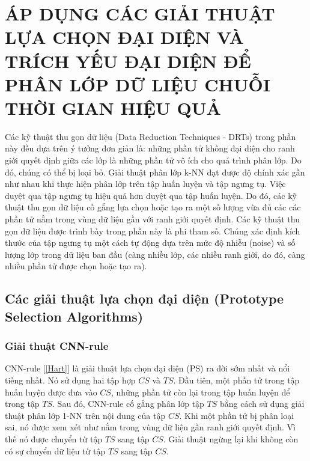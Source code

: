 \documentclass[13pt,oneside]{scrbook}
\begin{document}
\section{ÁP DỤNG CÁC GIẢI THUẬT LỰA CHỌN ĐẠI DIỆN VÀ TRÍCH YẾU ĐẠI DIỆN ĐỂ PHÂN LỚP DỮ LIỆU CHUỖI THỜI GIAN HIỆU QUẢ}
Các kỹ thuật thu gọn dữ liệu (Data Reduction Techniques - DRTs) trong phần này đều dựa trên ý tưởng đơn giản là: những phần tử không đại diện cho ranh giới quyết định giữa các lớp là những phần tử vô ích cho quá trình phân lớp. Do đó, chúng có thể bị loại bỏ. Giải thuật phân lớp k-NN đạt được độ chính xác gần như nhau khi thực hiện phân lớp trên tập huấn luyện và tập ngưng tụ. Việc duyệt qua tập ngưng tụ hiệu quả hơn duyệt qua tập huấn luyện. Do đó, các kỹ thuật thu gọn dữ liệu cố gắng lựa chọn hoặc tạo ra một số lượng vừa đủ các các phần tử nằm trong vùng dữ liệu gần với ranh giới quyết định. Các kỹ thuật thu gọn dữ liệu được trình bày trong phần này là phi tham số. Chúng xác định kích thước của tập ngưng tụ một cách tự động dựa trên mức độ nhiễu (noise) và số lượng lớp trong dữ liệu ban đầu (càng nhiều lớp, các nhiều ranh giới, do đó, càng nhiều phần tử được chọn hoặc tạo ra).
\subsection{Các giải thuật lựa chọn đại diện (Prototype Selection Algorithms)}
\subsubsection{Giải thuật CNN-rule}
CNN-rule [\ref{Hart}] là giải thuật lựa chọn đại diện (PS) ra đời sớm nhất và nổi tiếng nhất. 
Nó sử dụng hai tập hợp $CS$ và $TS$. 
Đầu tiên, một phần tử trong tập huấn luyện được đưa vào $CS$, những phần tử còn lại trong tập huấn luyện để trong tập $TS$.
Sau đó, CNN-rule cố gắng phân lớp tập $TS$ bằng cách sử dụng giải thuật phân lớp 1-NN trên nội dung của tập $CS$.
Khi một phần tử bị phân loại sai, nó được xem xét như nằm trong vùng dữ liệu gần ranh giới quyết định.
Vì thế nó được chuyển từ tập $TS$ sang tập $CS$.
Giải thuật ngừng lại khi không còn có sự chuyển dữ liệu từ tập $TS$ sang tập $CS$.
\end{document}
